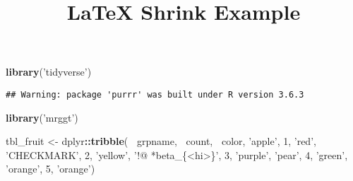 \documentclass[]{article}
\title{LaTeX Shrink Example}
\author{}
\date{\vspace{-2.5em}}
\newenvironment{Shaded}{\begin{snugshade}}{\end{snugshade}}
\newcommand{\DecValTok}[1]{\textcolor[rgb]{0.00,0.00,0.81}{#1}}
\newcommand{\KeywordTok}[1]{\textcolor[rgb]{0.13,0.29,0.53}{\textbf{#1}}}
\newcommand{\NormalTok}[1]{#1}
\newcommand{\OperatorTok}[1]{\textcolor[rgb]{0.81,0.36,0.00}{\textbf{#1}}}
\newcommand{\StringTok}[1]{\textcolor[rgb]{0.31,0.60,0.02}{#1}}
\begin{document}
\maketitle

\begin{Shaded}
\begin{Highlighting}[]
\KeywordTok{library}\NormalTok{(}\StringTok{'tidyverse'}\NormalTok{)}
\end{Highlighting}
\end{Shaded}

\begin{verbatim}
## Warning: package 'purrr' was built under R version 3.6.3
\end{verbatim}

\begin{Shaded}
\begin{Highlighting}[]
\KeywordTok{library}\NormalTok{(}\StringTok{'mrggt'}\NormalTok{)}
\end{Highlighting}
\end{Shaded}

\begin{Shaded}
\begin{Highlighting}[]
\NormalTok{tbl_fruit <-}\StringTok{ }\NormalTok{dplyr}\OperatorTok{::}\KeywordTok{tribble}\NormalTok{( }\OperatorTok{~}\NormalTok{grpname, }\OperatorTok{~}\NormalTok{count, }\OperatorTok{~}\NormalTok{color,}
                                              \StringTok{'apple'}\NormalTok{, }\DecValTok{1}\NormalTok{, }\StringTok{'red'}\NormalTok{,}
                                              \StringTok{'CHECKMARK'}\NormalTok{, }\DecValTok{2}\NormalTok{, }\StringTok{'yellow'}\NormalTok{,}
                                              \StringTok{'!@ *beta_\{<hi>\}'}\NormalTok{, }\DecValTok{3}\NormalTok{, }\StringTok{'purple'}\NormalTok{,}
                                              \StringTok{'pear'}\NormalTok{, }\DecValTok{4}\NormalTok{, }\StringTok{'green'}\NormalTok{,}
                                              \StringTok{'orange'}\NormalTok{, }\DecValTok{5}\NormalTok{, }\StringTok{'orange'}\NormalTok{)}
\end{Highlighting}
\end{Shaded}
\end{document}
